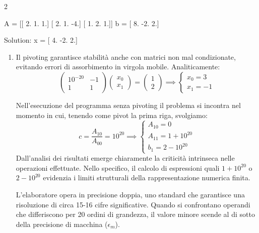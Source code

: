 \begin{multicols}{2}
\begin{enumerate}[series=miolista]
    \begin{elegantcode}[title=Uso di \textit{BackGauss()} per trovare la soluzione del problema (implementazione di PP)]
A =
 [[ 2.  1.  1.]
 [ 2.  1. -4.]
 [ 1.  2.  1.]]
b = [ 8. -2.  2.] 

Solution:
x = [ 4. -2.  2.]
    \end{elegantcode}
\end{enumerate}
\end{multicols}

\begin{enumerate}[resume=miolista]
    \item Il pivoting garantisce stabilità anche con matrici non mal condizionate, evitando errori di assorbimento in virgola mobile. Analiticamente:
    \[
    \begin{pmatrix} 10^{-20} & -1 \\ 1 & 1 \end{pmatrix}
    \begin{pmatrix} x_0 \\ x_1 \end{pmatrix} =
    \begin{pmatrix} 1 \\ 2 \end{pmatrix} \implies
    \begin{cases} x_0 = 3 \\ x_1 = -1 \end{cases}
    \]

    Nell'esecuzione del programma senza pivoting il problema si incontra nel momento in cui, tenendo come pivot la prima riga, svolgiamo:
    $$c =\frac{A_{10}}{A_{00}}=10^{20} \implies
    \begin{cases}
        A_{10} = 0 \\
        A_{11} = 1+10^{20}\\
        b_1 = 2-10^{20}
    \end{cases}    
    $$    
    Dall'analisi dei risultati emerge chiaramente la criticità intrinseca nelle operazioni effettuate. Nello specifico, il calcolo di espressioni quali $1+10^{20}$ o $2-10^{20}$ evidenzia i limiti strutturali della rappresentazione numerica finita.
    
    L'elaboratore opera in precisione doppia, uno standard che garantisce una risoluzione di circa 15-16 cifre significative. Quando si confrontano operandi che differiscono per 20 ordini di grandezza, il valore minore scende al di sotto della precisione di macchina ($\epsilon_m$). 
    

\end{enumerate}
